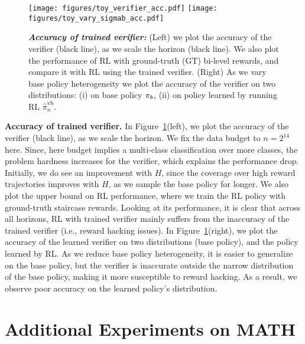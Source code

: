 \begin{figure}[!ht]
    \centering
    \texttt{[image: figures/toy\_verifier\_acc.pdf]}
    \hspace{2em}
    \texttt{[image: figures/toy\_vary\_sigmab\_acc.pdf]}
    \caption{\textbf{\emph{Accuracy of trained verifier:}}
    (Left) we plot the accuracy of the verifier (black line), as we scale the horizon (black line). We also plot the performance of RL with ground-truth (GT) bi-level rewards, and compare it with RL using the trained verifier. (Right) As we vary base policy heterogeneity we plot the accuracy of the verifier on two distributions: (i) on base policy $\pi_b$, (ii) on policy learned by running RL $\hat{\pi}^\mathrm{vb}_n$.    }
    \label{fig:didactic-verifier-acc-1}
\end{figure}


\textbf{Accuracy of trained verifier.} In Figure~\ref{fig:didactic-verifier-acc-1}(left), we plot the accuracy of the verifier (black line), as we scale the horizon. We fix the data budget to $n=2^14$ here. Since, here budget implies a multi-class classification over more classes, the problem hardness increases for the verifier, which explains the performance drop. Initially, we do see an improvement with $H$, since the coverage over high reward trajectories improves with $H$, as we sample the base policy for longer. 
We also plot the upper bound on RL performance, where we train the RL policy with ground-truth staircase rewards. Looking at its performance, it is clear that across all horizons, RL with trained verifier mainly suffers from the inaccuracy of the trained verifier (i.e., reward hacking issues). In Figure~\ref{fig:didactic-verifier-acc-1}(right), we plot the accuracy of the learned verifier on two distributions (base policy), and the policy learned by RL. As we reduce base policy heterogeneity, it is easier to generalize on the base policy, but the verifier is inaccurate outside the narrow distribution of the base policy, making it more susceptible to reward hacking. As a result, we observe poor accuracy on the learned policy's distribution. 

\vspace{-1em}

\section{Additional Experiments on MATH}
\label{sec:additional-math}




